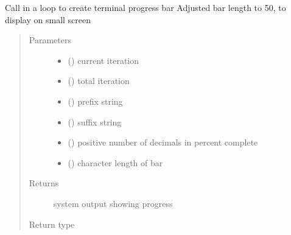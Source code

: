 \documentclass[letterpaper,10pt,english]{sphinxmanual}
\begin{document}

\begin{fulllineitems}
\label{\detokenize{openfdem:openfdem.formatting_codes.print_progress}}
Call in a loop to create terminal progress bar
Adjusted bar length to 50, to display on small screen
\begin{quote}\begin{description}
\item[{Parameters}] \leavevmode\begin{itemize}
\item {} 
 () \textendash{} current iteration

\item {} 
 () \textendash{} total iteration

\item {} 
 () \textendash{} prefix string

\item {} 
 () \textendash{} suffix string

\item {} 
 () \textendash{} positive number of decimals in percent complete

\item {} 
 () \textendash{} character length of bar

\end{itemize}

\item[{Returns}] \leavevmode
system output showing progress

\item[{Return type}] \leavevmode


\end{description}\end{quote}

\end{fulllineitems}
\end{document}

